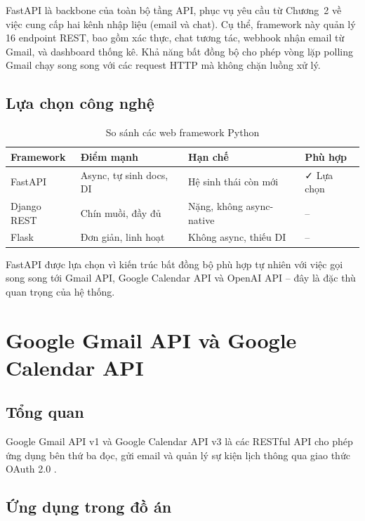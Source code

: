 \documentclass[../DoAn.tex]{subfiles}
\begin{document}
FastAPI là backbone của toàn bộ tầng API, phục vụ yêu cầu từ Chương~2 về việc cung cấp hai kênh nhập liệu (email và chat). Cụ thể, framework này quản lý 16 endpoint REST, bao gồm xác thực, chat tương tác, webhook nhận email từ Gmail, và dashboard thống kê. Khả năng bất đồng bộ cho phép vòng lặp polling Gmail chạy song song với các request HTTP mà không chặn luồng xử lý.

\subsection{Lựa chọn công nghệ}

\begin{table}[ht]
\centering
\caption{So sánh các web framework Python}
\label{tab:framework-comparison}
\begin{tabular}{|l|l|l|l|}
\hline
\textbf{Framework} & \textbf{Điểm mạnh} & \textbf{Hạn chế} & \textbf{Phù hợp} \\
\hline
FastAPI & Async, tự sinh docs, DI & Hệ sinh thái còn mới & ✓ Lựa chọn \\
Django REST & Chín muồi, đầy đủ & Nặng, không async-native & -- \\
Flask & Đơn giản, linh hoạt & Không async, thiếu DI & -- \\
\hline
\end{tabular}
\end{table}

FastAPI được lựa chọn vì kiến trúc bất đồng bộ phù hợp tự nhiên với việc gọi song song tới Gmail API, Google Calendar API và OpenAI API -- đây là đặc thù quan trọng của hệ thống.

\section{Google Gmail API và Google Calendar API}

\subsection{Tổng quan}

Google Gmail API v1 và Google Calendar API v3 là các RESTful API cho phép ứng dụng bên thứ ba đọc, gửi email và quản lý sự kiện lịch thông qua giao thức OAuth 2.0 \cite{google2024gmailapi,google2024calendarapi}.

\subsection{Ứng dụng trong đồ án}
\end{document}
